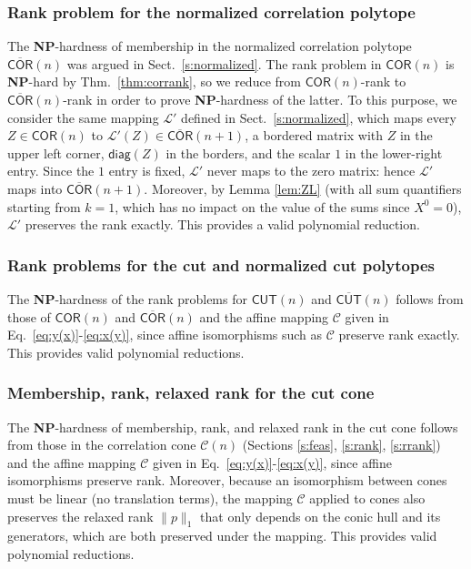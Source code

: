 \documentclass[envcountsect,envcountsame]{svjour3}
\theoremstyle{changebreak}                %
\newcommand{\COR}[1]{\mathsf{COR}(#1)}
\newcommand{\nCOR}[1]{\mathsf{\overline{COR}}(#1)}
\newcommand{\CUT}[1]{\mathsf{CUT}(#1)}
\newcommand{\nCUT}[1]{\mathsf{\overline{CUT}}(#1)}
\newcommand{\CONX}[1]{\mathcal{C}(#1)}
\newcommand{\diag}[1]{\mathsf{diag}(#1)}
\begin{document}
\subsubsection{Rank problem for the normalized correlation polytope}
The \textbf{NP}-hardness of membership in the normalized correlation polytope $\nCOR{n}$ was argued in Sect.~\ref{s:normalized}. The rank problem in $\COR{n}$ is \textbf{NP}-hard by Thm.~\ref{thm:corrank}, so we reduce from $\COR{n}$-rank to $\nCOR{n}$-rank in order to prove \textbf{NP}-hardness of the latter. To this purpose, we consider the same mapping $\mathscr{L}'$ defined in Sect.~\ref{s:normalized}, which maps every $Z\in\COR{n}$ to $\mathscr{L}'(Z)\in\nCOR{n+1}$, a bordered matrix with $Z$ in the upper left corner, $\diag{Z}$ in the borders, and the scalar $1$ in the lower-right entry. Since the $1$ entry is fixed, $\mathscr{L}'$ never maps to the zero matrix: hence $\mathscr{L}'$ maps into $\nCOR{n+1}$. Moreover, by Lemma \ref{lem:ZL} (with all sum quantifiers starting from $k=1$, which has no impact on the value of the sums since $X^0=0$), $\mathscr{L}'$ preserves the rank exactly. This provides a valid polynomial reduction.

\subsubsection{Rank problems for the cut and normalized cut polytopes}
The \textbf{NP}-hardness of the rank problems for $\CUT{n}$ and $\nCUT{n}$ follows from those of $\COR{n}$ and $\nCOR{n}$ and the affine mapping $\mathscr{C}$ given in Eq.~\eqref{eq:y(x)}-\eqref{eq:x(y)}, since affine isomorphisms such as $\mathscr{C}$ preserve rank exactly. This provides valid polynomial reductions.

\subsubsection{Membership, rank, relaxed rank for the cut cone}
The \textbf{NP}-hardness of membership, rank, and relaxed rank in the cut cone follows from those in the correlation cone $\CONX{n}$ (Sections \ref{s:feas}, \ref{s:rank}, \ref{s:rrank}) and the affine mapping $\mathscr{C}$ given in Eq.~\eqref{eq:y(x)}-\eqref{eq:x(y)}, since affine isomorphisms preserve rank. Moreover, because an isomorphism between cones must be linear (no translation terms), the mapping $\mathscr{C}$ applied to cones also preserves the relaxed rank $\|p\|_1$ that only depends on the conic hull and its generators, which are both preserved under the mapping. This provides valid polynomial reductions.
\end{document}
